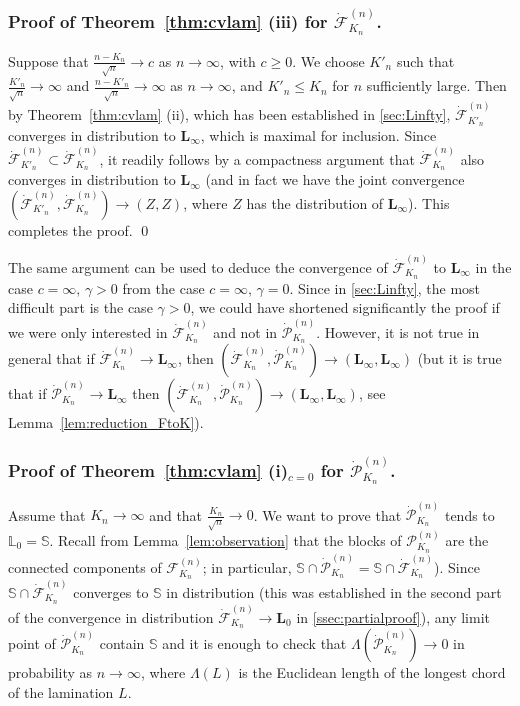 \documentclass[10pt]{amsart}
\theoremstyle{definition}\newtheorem{defi}[theo]{Definition}\newtheorem{rema}[theo]{Remark}\newtheorem{exam}[theo]{Example}\newtheorem{exem}[theo]{Example}\newtheorem{nota}[theo]{Notation}
\def\S{\mathbb{S}}
\def\FFF{\mathcal F}
\def\FKn{\mathcal{F}^{(n)}_{K_{n}}}
\def\PKn{\mathcal{P}^{(n)}_{K_{n}}}
\def\dFKn{\dot{\mathcal{F}}^{(n)}_{K_{n}}}
\def\dPKn{\dot{\mathcal{P}}^{(n)}_{K_{n}}}
\begin{document}
\subsubsection{Proof of  Theorem~\ref{thm:cvlam} (iii) for $ \dFKn$.}
\label{sssec:iiiF}
Suppose that $ \frac{n-K_{n}}{\sqrt{n}} \rightarrow c$ as $n \rightarrow \infty$, with $c \geq 0$. We choose $K'_{n}$ such that $ \frac{K'_{n}}{\sqrt{n}} \rightarrow \infty$ and $ \frac{n-K'_{n}}{\sqrt{n}} \rightarrow \infty$ as $n \rightarrow \infty$, and $K'_{n} \leq K_{n}$ for $n$ sufficiently large. Then by  Theorem~\ref{thm:cvlam} (ii), which has been established in \cref{sec:Linfty}, $ \dot{\FFF}^{(n)}_{K'_{n}}$ converges in distribution to $\mathbf{L}_{\infty}$, which is maximal for inclusion. Since  $ \dot{\FFF}^{(n)}_{K'_{n}}\subset\dFKn$, it readily follows by a compactness argument that $ \dFKn$ also converges in distribution to $\mathbf{L}_{\infty}$ (and in fact we have the joint convergence $ (\dot{\FFF}^{(n)}_{K'_{n}},\dFKn) \to (Z,Z)$, where $Z$ has the distribution of $\mathbf{L}_{\infty}$). This completes the proof. \qed

\begin{remark}
  The same argument can be used to deduce the convergence of $\dFKn$ to $\mathbf L_\infty$ in the case
  $c=\infty,\, \gamma>0$ from the case $c=\infty,\, \gamma=0$.
  Since in \cref{sec:Linfty}, the most difficult part is the case $\gamma>0$,
  we could have shortened significantly the proof if we were only interested in $\dFKn$
  and not in $\dPKn$. However, it is not true in general that  if $\dFKn \rightarrow \mathbf{L}_{\infty}$, then    $(\dFKn,\dPKn) \rightarrow ( \mathbf{L}_{\infty}, \mathbf{L}_{\infty})$ (but it is true that if $\dPKn \rightarrow \mathbf{L}_{\infty}$ then $(\dFKn,\dPKn) \rightarrow ( \mathbf{L}_{\infty}, \mathbf{L}_{\infty})$, see Lemma~\ref{lem:reduction_FtoK}).
\end{remark}





\subsubsection{Proof of Theorem~\ref{thm:cvlam} (i)$_{c=0}$ for $ \dPKn$.}
\label{sssec:P0}

Assume that $K_{n} \rightarrow \infty$ and that $\frac{K_n}{\sqrt{n}} \to 0$.
We want to prove that $\dPKn$ tends to $\mathbb{L}_0=\S$.
Recall from Lemma~\ref{lem:observation} that
the blocks of $\PKn$ are the connected components of $\FKn$; in particular, $ \S \cap \dPKn= \S \cap \dFKn$).
Since $\S \cap \dFKn$ converges to $\S$ in distribution
(this was established in the second part of the convergence in distribution
$\dFKn \rightarrow \mathbf{L}_0$ in \cref{ssec:partialproof}),
any limit point of $\dPKn$ contain $\S$ and
it is enough to check that
$\Lambda(\dPKn) \rightarrow 0$  in probability as $n \rightarrow \infty$,
where $\Lambda(L)$ is the Euclidean length of the longest chord of the lamination $L$.
\end{document}
